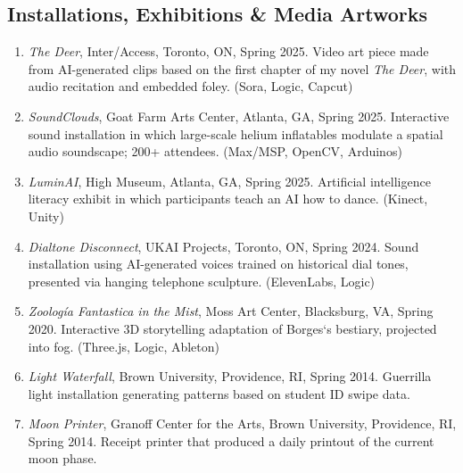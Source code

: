  
   \subsection{Installations, Exhibitions \& Media Artworks}

\begin{enumerate}

  \item \emph{The Deer}, Inter/Access, Toronto, ON, Spring 2025.
  \subitem Video art piece made from AI-generated clips based on the first chapter of my novel \emph{The Deer}, with audio recitation and embedded foley. (Sora, Logic, Capcut)\\

  \item \emph{SoundClouds}, Goat Farm Arts Center, Atlanta, GA, Spring 2025.
  \subitem Interactive sound installation in which large-scale helium inflatables modulate a spatial audio soundscape; 200+ attendees. (Max/MSP, OpenCV, Arduinos)\\

  \item \emph{LuminAI}, High Museum, Atlanta, GA, Spring 2025.
  \subitem Artificial intelligence literacy exhibit in which participants teach an AI how to dance. (Kinect, Unity)\\

  \item \emph{Dialtone Disconnect}, UKAI Projects, Toronto, ON, Spring 2024.
  \subitem Sound installation using AI-generated voices trained on historical dial tones, presented via hanging telephone sculpture. (ElevenLabs, Logic)\\

  \item \emph{Zoolog\'ia Fantastica in the Mist}, Moss Art Center, Blacksburg, VA, Spring 2020.
  \subitem Interactive 3D storytelling adaptation of Borges`s bestiary, projected into fog. (Three.js, Logic, Ableton)\\

  \item \emph{Light Waterfall}, Brown University, Providence, RI, Spring 2014.
  \subitem Guerrilla light installation generating patterns based on student ID swipe data.\\

  \item \emph{Moon Printer}, Granoff Center for the Arts, Brown University, Providence, RI, Spring 2014.
  \subitem Receipt printer that produced a daily printout of the current moon phase.\\

\end{enumerate}


